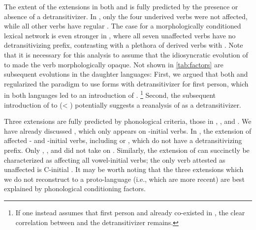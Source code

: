 

The extent of the extensions in both \PWai and \PPek is fully predicted by the presence or absence of a detransitivizer.
In \PWai, only the four underived  verbs were not affected, while all other  verbs have regular .
The case for a morphologically conditioned lexical network is even stronger in \PPek, where all seven unaffected verbs have no detransitivizing prefix, contrasting with a plethora of derived  verbs with .
Note that it is necessary for this analysis to assume that the idiosyncratic evolution of   to   made the verb morphologically opaque.
Not shown in \cref{tab:factors} are subsequent evolutions in the daughter languages:
First, we argued that both \ikpeng and \bakairi regularized the paradigm to use forms with detransitivizer for first person, which in both languages led to an introduction of .%
\footnote{If one instead assumes that first person  and  already co-existed in \PPek, the clear correlation between  and the detransitivizer remains.}
Second, the subsequent introduction of  to \ikpeng {}  (< ) potentially suggests a reanalysis of  as a detransitivizer.

Three extensions are fully predicted by phonological criteria, those in \akuriyo, \carijo, and \yukpa.
We have already discussed \akuriyo {} , which only appears on -initial verbs.
In \carijo, the extension of  affected - and -initial verbs, including   or  , which do not have a detransitivizing prefix.
Only  ,  , and   did not take on .
Similarly, the extension of \yukpa {} can succinctly be characterized as affecting all vowel-initial verbs; the only verb attested as unaffected is C-initial  .
It may be worth noting that the three extensions which we do not reconstruct to a proto-language (i.e., which are more recent) are best explained by phonological conditioning factors.

